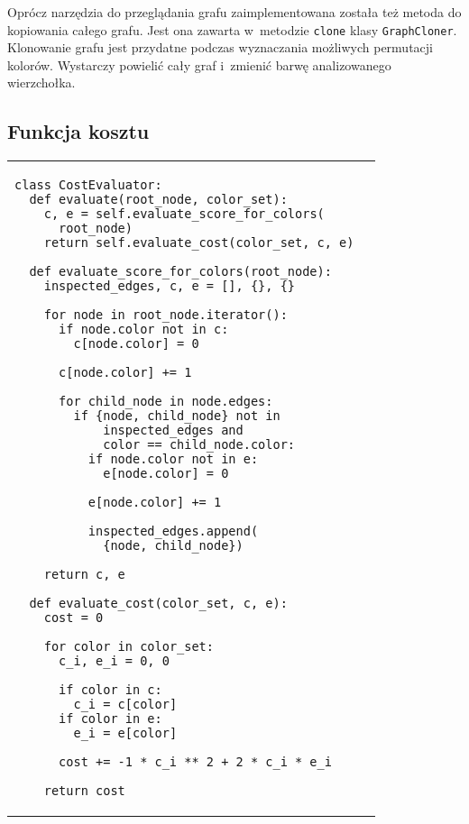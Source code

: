 \documentclass[a4paper,10pt]{article}
\begin{document}
Oprócz narzędzia do przeglądania grafu zaimplementowana została też metoda do kopiowania całego grafu. Jest ona zawarta w~metodzie \verb+clone+ klasy \verb+GraphCloner+. Klonowanie grafu jest przydatne podczas wyznaczania możliwych permutacji kolorów. Wystarczy powielić cały graf i~zmienić barwę analizowanego wierzchołka.

\subsection*{Funkcja kosztu}

\noindent\begin{table}[ht!]
            \begin{tabular}{lr}
                \begin{minipage}[t]{0.55\textwidth}
                    \begin{verbatim}
class CostEvaluator:
  def evaluate(root_node, color_set):
    c, e = self.evaluate_score_for_colors(
      root_node)
    return self.evaluate_cost(color_set, c, e)

  def evaluate_score_for_colors(root_node):
    inspected_edges, c, e = [], {}, {}

    for node in root_node.iterator():
      if node.color not in c:
        c[node.color] = 0

      c[node.color] += 1

      for child_node in node.edges:
        if {node, child_node} not in 
            inspected_edges and 
            color == child_node.color:
          if node.color not in e:
            e[node.color] = 0

          e[node.color] += 1
          
          inspected_edges.append(
            {node, child_node})

    return c, e
    
  def evaluate_cost(color_set, c, e):
    cost = 0

    for color in color_set:
      c_i, e_i = 0, 0

      if color in c:
        c_i = c[color]
      if color in e:
        e_i = e[color]

      cost += -1 * c_i ** 2 + 2 * c_i * e_i

    return cost
                    \end{verbatim}
                \end{minipage}
                
                &
        

\end{tabular}
\end{table}
\end{document}
